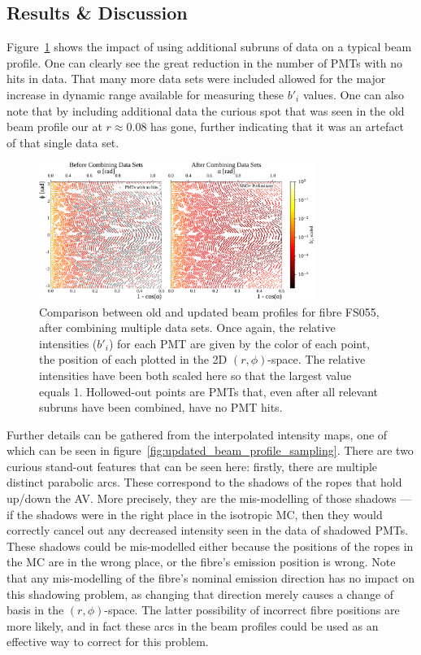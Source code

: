 \subsection{Results \& Discussion}\label{sect:results}
Figure~\ref{fig:updated_beam_profile} shows the impact of using additional subruns of data on a typical beam profile. One can clearly see the great reduction in the number of PMTs with no hits in data. That many more data sets were included allowed for the major increase in dynamic range available for measuring these $b'_{i}$ values. One can also note that by including additional data the curious spot that was seen in the old beam profile our at $r\approx0.08$ has gone, further indicating that it was an artefact of that single data set.
\begin{figure}
    \centering
    \includegraphics[width=0.8\textwidth]{5_SMELLIESimulation/images/flat_plot_r_comparison_FS055_old_vs_new_empty_circles.pdf}
    \caption{Comparison between old and updated beam profiles for fibre FS055, after combining multiple data sets. Once again, the relative intensities ($b'_{i}$) for each PMT are given by the color of each point, the position of each plotted in the 2D $(r,\phi)$-space. The relative intensities have been both scaled here so that the largest value equals 1. Hollowed-out points are PMTs that, even after all relevant subruns have been combined, have no PMT hits.}
    \label{fig:updated_beam_profile}
\end{figure}

Further details can be gathered from the interpolated intensity maps, one of which can be seen in figure~\ref{fig:updated_beam_profile_sampling}. There are two curious stand-out features that can be seen here: firstly, there are multiple distinct parabolic arcs. These correspond to the shadows of the ropes that hold up/down the AV. More precisely, they are the mis-modelling of those shadows --- if the shadows were in the right place in the isotropic MC, then they would correctly cancel out any decreased intensity seen in the data of shadowed PMTs. These shadows could be mis-modelled either because the positions of the ropes in the MC are in the wrong place, or the fibre's emission position is wrong. Note that any mis-modelling of the fibre's nominal emission direction has no impact on this shadowing problem, as changing that direction merely causes a change of basis in the $(r,\phi)$-space. The latter possibility of incorrect fibre positions are more likely, and in fact these arcs in the beam profiles could be used as an effective way to correct for this problem.

